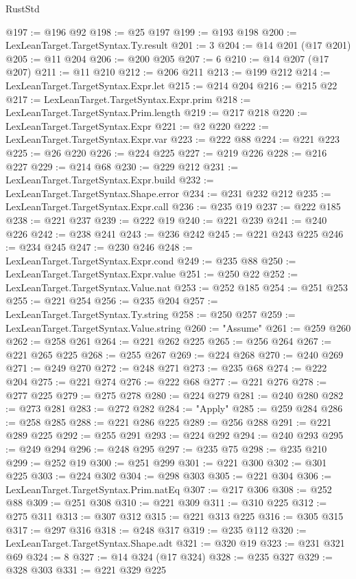 \begin{lexlean}{RustStd}
\begin{coremodule}
@197 := @196 @92
@198 := @25 @197
@199 := @193 @198
@200 := LexLeanTarget.TargetSyntax.Ty.result
@201 := 3
@204 := @14 @201 (@17 @201)
@205 := @11 @204
@206 := @200 @205
@207 := 6
@210 := @14 @207 (@17 @207)
@211 := @11 @210
@212 := @206 @211
@213 := @199 @212
@214 := LexLeanTarget.TargetSyntax.Expr.let
@215 := @214 @204
@216 := @215 @22
@217 := LexLeanTarget.TargetSyntax.Expr.prim
@218 := LexLeanTarget.TargetSyntax.Prim.length
@219 := @217 @218
@220 := LexLeanTarget.TargetSyntax.Expr
@221 := @2 @220
@222 := LexLeanTarget.TargetSyntax.Expr.var
@223 := @222 @88
@224 := @221 @223
@225 := @26 @220
@226 := @224 @225
@227 := @219 @226
@228 := @216 @227
@229 := @214 @68
@230 := @229 @212
@231 := LexLeanTarget.TargetSyntax.Expr.build
@232 := LexLeanTarget.TargetSyntax.Shape.error
@234 := @231 @232 @212
@235 := LexLeanTarget.TargetSyntax.Expr.call
@236 := @235 @19
@237 := @222 @185
@238 := @221 @237
@239 := @222 @19
@240 := @221 @239
@241 := @240 @226
@242 := @238 @241
@243 := @236 @242
@245 := @221 @243 @225
@246 := @234 @245
@247 := @230 @246
@248 := LexLeanTarget.TargetSyntax.Expr.cond
@249 := @235 @88
@250 := LexLeanTarget.TargetSyntax.Expr.value
@251 := @250 @22
@252 := LexLeanTarget.TargetSyntax.Value.nat
@253 := @252 @185
@254 := @251 @253
@255 := @221 @254
@256 := @235 @204
@257 := LexLeanTarget.TargetSyntax.Ty.string
@258 := @250 @257
@259 := LexLeanTarget.TargetSyntax.Value.string
@260 := "Assume"
@261 := @259 @260
@262 := @258 @261
@264 := @221 @262 @225
@265 := @256 @264
@267 := @221 @265 @225
@268 := @255 @267
@269 := @224 @268
@270 := @240 @269
@271 := @249 @270
@272 := @248 @271
@273 := @235 @68
@274 := @222 @204
@275 := @221 @274
@276 := @222 @68
@277 := @221 @276
@278 := @277 @225
@279 := @275 @278
@280 := @224 @279
@281 := @240 @280
@282 := @273 @281
@283 := @272 @282
@284 := "Apply"
@285 := @259 @284
@286 := @258 @285
@288 := @221 @286 @225
@289 := @256 @288
@291 := @221 @289 @225
@292 := @255 @291
@293 := @224 @292
@294 := @240 @293
@295 := @249 @294
@296 := @248 @295
@297 := @235 @75
@298 := @235 @210
@299 := @252 @19
@300 := @251 @299
@301 := @221 @300
@302 := @301 @225
@303 := @224 @302
@304 := @298 @303
@305 := @221 @304
@306 := LexLeanTarget.TargetSyntax.Prim.natEq
@307 := @217 @306
@308 := @252 @88
@309 := @251 @308
@310 := @221 @309
@311 := @310 @225
@312 := @275 @311
@313 := @307 @312
@315 := @221 @313 @225
@316 := @305 @315
@317 := @297 @316
@318 := @248 @317
@319 := @235 @112
@320 := LexLeanTarget.TargetSyntax.Shape.adt
@321 := @320 @19
@323 := @231 @321 @69
@324 := 8
@327 := @14 @324 (@17 @324)
@328 := @235 @327
@329 := @328 @303
@331 := @221 @329 @225

\end{coremodule}
\end{lexlean}
